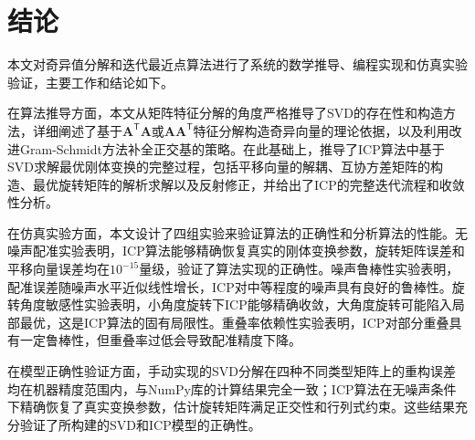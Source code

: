 \documentclass[a4paper,12pt]{ctexrep}
\begin{document}
\chapter{结论}

本文对奇异值分解和迭代最近点算法进行了系统的数学推导、编程实现和仿真实验验证，主要工作和结论如下。

在算法推导方面，本文从矩阵特征分解的角度严格推导了SVD的存在性和构造方法，详细阐述了基于$\bm{A}^{\mathsf{T}}\bm{A}$或$\bm{A}\bm{A}^{\mathsf{T}}$特征分解构造奇异向量的理论依据，以及利用改进Gram-Schmidt方法补全正交基的策略。在此基础上，推导了ICP算法中基于SVD求解最优刚体变换的完整过程，包括平移向量的解耦、互协方差矩阵的构造、最优旋转矩阵的解析求解以及反射修正，并给出了ICP的完整迭代流程和收敛性分析。

在仿真实验方面，本文设计了四组实验来验证算法的正确性和分析算法的性能。无噪声配准实验表明，ICP算法能够精确恢复真实的刚体变换参数，旋转矩阵误差和平移向量误差均在$10^{-15}$量级，验证了算法实现的正确性。噪声鲁棒性实验表明，配准误差随噪声水平近似线性增长，ICP对中等程度的噪声具有良好的鲁棒性。旋转角度敏感性实验表明，小角度旋转下ICP能够精确收敛，大角度旋转可能陷入局部最优，这是ICP算法的固有局限性。重叠率依赖性实验表明，ICP对部分重叠具有一定鲁棒性，但重叠率过低会导致配准精度下降。

在模型正确性验证方面，手动实现的SVD分解在四种不同类型矩阵上的重构误差均在机器精度范围内，与NumPy库的计算结果完全一致；ICP算法在无噪声条件下精确恢复了真实变换参数，估计旋转矩阵满足正交性和行列式约束。这些结果充分验证了所构建的SVD和ICP模型的正确性。
\end{document}
